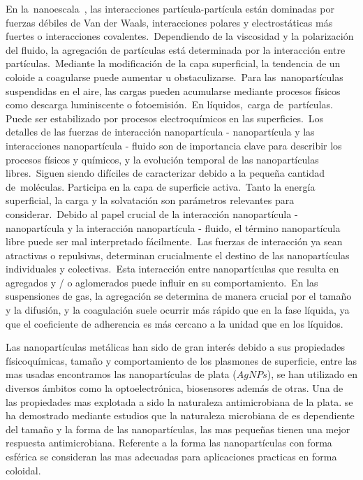 En la nanoescala , las interacciones partícula-partícula están dominadas por fuerzas débiles de Van der Waals, interacciones polares y electrostáticas más fuertes o interacciones covalentes. Dependiendo de la viscosidad y la polarización del fluido, la agregación de partículas está determinada por la interacción entre partículas. Mediante la modificación de la capa superficial, la tendencia de un coloide a coagularse puede aumentar u obstaculizarse. Para las nanopartículas suspendidas en el aire, las cargas pueden acumularse mediante procesos físicos como descarga luminiscente o fotoemisión. En líquidos, carga de partículas. Puede ser estabilizado por procesos electroquímicos en las superficies. Los detalles de las fuerzas de interacción nanopartícula - nanopartícula y las interacciones nanopartícula - fluido son de importancia clave para describir los procesos físicos y químicos, y la evolución temporal de las nanopartículas libres. Siguen siendo difíciles de caracterizar debido a la pequeña cantidad de moléculas. Participa en la capa de superficie activa. Tanto la energía superficial, la carga y la solvatación son parámetros relevantes para considerar. Debido al papel crucial de la interacción nanopartícula - nanopartícula y la interacción nanopartícula - fluido, el término nanopartícula libre puede ser mal interpretado fácilmente. Las fuerzas de interacción ya sean atractivas o repulsivas, determinan crucialmente el destino de las nanopartículas individuales y colectivas. Esta interacción entre nanopartículas que resulta en agregados y / o aglomerados puede influir en su comportamiento. En las suspensiones de gas, la agregación se determina de manera crucial por el tamaño y la difusión, y la coagulación suele ocurrir más rápido que en la fase líquida, ya que el coeficiente de adherencia es más cercano a la unidad que en los líquidos.

Las nanopartículas metálicas han sido de gran interés debido a sus propiedades físicoquímicas, tamaño y comportamiento de los plasmones de superficie, entre las mas usadas encontramos las nanopartículas de plata ($AgNPs$), se han utilizado en diversos ámbitos como la optoelectrónica, biosensores además de otras. Una de las propiedades mas explotada a sido la naturaleza antimicrobiana de la plata. se ha demostrado mediante estudios que la naturaleza microbiana de es dependiente del tamaño y la forma de las nanopartículas, las mas pequeñas tienen una mejor respuesta antimicrobiana. Referente a la forma las nanopartículas con forma esférica se consideran las mas adecuadas para aplicaciones practicas en forma coloidal. 

